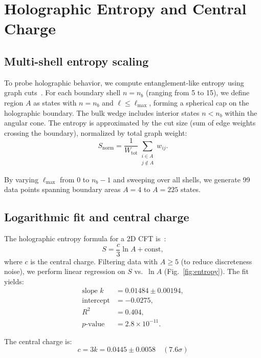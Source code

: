 \documentclass[aps,prl,twocolumn,showpacs,superscriptaddress,groupedaddress]{revtex4-2}
\begin{document}
\section{Holographic Entropy and Central Charge}

\subsection{Multi-shell entropy scaling}

To probe holographic behavior, we compute entanglement-like entropy using graph cuts~\cite{Wolf2008,Eisert2010}. For each boundary shell $n = n_b$ (ranging from 5 to 15), we define region $A$ as states with $n = n_b$ and $\ell \leq \ell_{\max}$, forming a spherical cap on the holographic boundary. The bulk wedge includes interior states $n < n_b$ within the angular cone. The entropy is approximated by the cut size (sum of edge weights crossing the boundary), normalized by total graph weight:
\begin{equation}
S_{\text{norm}} = \frac{1}{W_{\text{tot}}} \sum_{\substack{i \in A \\ j \notin A}} w_{ij}.
\end{equation}

By varying $\ell_{\max}$ from 0 to $n_b - 1$ and sweeping over all shells, we generate 99 data points spanning boundary areas $A = 4$ to $A = 225$ states.

\subsection{Logarithmic fit and central charge}

The holographic entropy formula for a 2D CFT is~\cite{Holzhey1994,Calabrese2004}:
\begin{equation}
S = \frac{c}{3} \ln A + \text{const},
\label{eq:holographic_entropy}
\end{equation}
where $c$ is the central charge. Filtering data with $A \geq 5$ (to reduce discreteness noise), we perform linear regression on $S$ vs.\ $\ln A$ (Fig.~\ref{fig:entropy}). The fit yields:
\begin{align}
\text{slope } k &= 0.01484 \pm 0.00194, \\
\text{intercept} &= -0.0275, \\
R^2 &= 0.404, \\
p\text{-value} &= 2.8 \times 10^{-11}.
\end{align}

The central charge is:
\begin{equation}
\boxed{c = 3k = 0.0445 \pm 0.0058 \quad (7.6\sigma)}
\end{equation}
\end{document}
